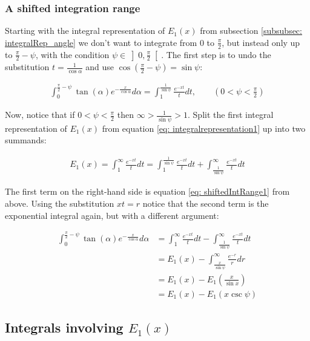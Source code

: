 \documentclass[bibliography=totocnumbered]{scrartcl}
\newcommand{\assume}[1][\text{MISSING PARAMETER}]{,\qquad\left(#1\right)}
\begin{document}
	\subsubsection{A shifted integration range}
	\label{subsubsec: shifted_intrange}
	
	Starting with the integral representation of $E_1\left(x\right)$ from subsection \ref{subsubsec: integralRep_angle} we don't want to integrate from $0$ to $\frac{\pi}{2}$, but instead only up to $\frac{\pi}{2}-\psi$, with the condition $\psi\in\left]0,\frac{\pi}{2}\right[$. The first step is to undo the substitution $t=\frac{1}{\cos\alpha}$ and use $\cos\left(\frac{\pi}{2}-\psi\right)=\sin\psi$:
	
	\begin{gather}
		\int_{0}^{\frac{\pi}{2}-\psi}\tan\left(\alpha\right)e^{-\frac{x}{\cos\alpha}}d\alpha=\int_{1}^{\frac{1}{\sin\psi}}\frac{e^{-xt}}{t}dt\assume[0<\psi<\frac{\pi}{2}]\label{eq: shiftedIntRange1}
	\end{gather}
	
	Now, notice that if $0<\psi<\frac{\pi}{2}$ then $\infty>\frac{1}{\sin\psi}>1$. Split the first integral representation of $E_1\left(x\right)$ from equation \eqref{eq: integralrepresentation1} up into two summands:
	
	\begin{gather}
		E_1\left(x\right)=\int_{1}^{\infty}\frac{e^{-xt}}{t}dt=\int_{1}^{\frac{1}{\sin\psi}}\frac{e^{-xt}}{t}dt+\int_{\frac{1}{\sin\psi}}^{\infty}\frac{e^{-xt}}{t}dt\label{eq: shiftedIntRange2}
	\end{gather}
	
	The first term on the right-hand side is equation \eqref{eq: shiftedIntRange1} from above. Using the substitution $xt=r$ notice that the second term is the exponential integral again, but with a different argument:
	
	\begin{align}
		\int_{0}^{\frac{\pi}{2}-\psi}\tan\left(\alpha\right)e^{-\frac{x}{\cos\alpha}}d\alpha&=\int_{1}^{\infty}\frac{e^{-xt}}{t}dt-\int_{\frac{1}{\sin\psi}}^{\infty}\frac{e^{-xt}}{t}dt\\
		&=E_1\left(x\right)-\int_{\frac{x}{\sin\psi}}^{\infty}\frac{e^{-r}}{r}dr\\
		&=E_1\left(x\right)-E_1\left(\frac{x}{\sin{x}}\right)\\
		&=E_1\left(x\right)-E_1\left(x\csc\psi\right)
	\end{align}
	
	\subsection[Integrals involving E1(x)]{Integrals involving $E_1\left(x\right)$}
\end{document}
